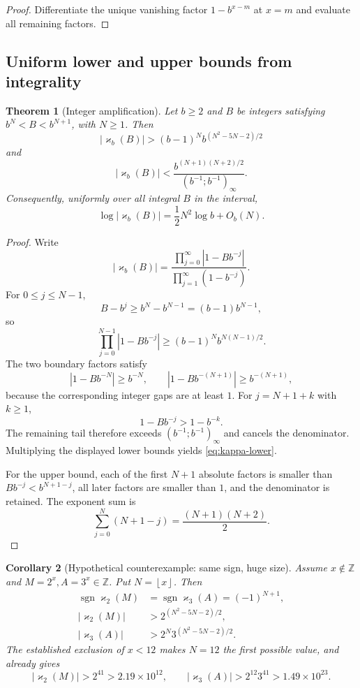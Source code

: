 \documentclass[11pt]{article}
\newtheorem{theorem}{Theorem}[section]
\newtheorem{corollary}[theorem]{Corollary}
\theoremstyle{definition}
\newcommand{\kk}{\varkappa}
\newcommand{\Z}{\mathbb{Z}}
\newcommand{\qpi}[2]{\left(#1;#2\right)_{\!\infty}}
\newcommand{\sgn}{\operatorname{sgn}}
\newcommand{\floor}[1]{\left\lfloor #1\right\rfloor}
\begin{document}
\begin{proof}
Differentiate the unique vanishing factor $1-b^{x-m}$ at $x=m$ and evaluate all remaining factors.
\end{proof}

\subsection{Uniform lower and upper bounds from integrality}

\begin{theorem}[Integer amplification]\label{thm:integer-amplification}
Let $b\ge2$ and $B$ be integers satisfying $b^N<B<b^{N+1}$, with $N\ge1$.  Then
\begin{equation}\label{eq:kappa-lower}
 \boxed{\displaystyle
 |\kk_b(B)|>(b-1)^N b^{(N^2-5N-2)/2}}
\end{equation}
and
\begin{equation}\label{eq:kappa-upper}
 |\kk_b(B)|<
 \frac{b^{(N+1)(N+2)/2}}{\qpi{b^{-1}}{b^{-1}}}.
\end{equation}
Consequently, uniformly over all integral $B$ in the interval,
\[
 \log|\kk_b(B)|=\frac12N^2\log b+O_b(N).
\]
\end{theorem}

\begin{proof}
Write
\[
 |\kk_b(B)|=
 \frac{\displaystyle\prod_{j=0}^{\infty}|1-Bb^{-j}|}
      {\displaystyle\prod_{j=1}^{\infty}(1-b^{-j})}.
\]
For $0\le j\le N-1$,
\[
 B-b^j\ge b^N-b^{N-1}=(b-1)b^{N-1},
\]
so
\[
 \prod_{j=0}^{N-1}|1-Bb^{-j}|
 \ge (b-1)^N b^{N(N-1)/2}.
\]
The two boundary factors satisfy
\[
 |1-Bb^{-N}|\ge b^{-N},\qquad
 |1-Bb^{-(N+1)}|\ge b^{-(N+1)},
\]
because the corresponding integer gaps are at least $1$.  For $j=N+1+k$ with $k\ge1$,
\[
 1-Bb^{-j}>1-b^{-k}.
\]
The remaining tail therefore exceeds $\qpi{b^{-1}}{b^{-1}}$ and cancels the denominator.  Multiplying the displayed lower bounds yields \eqref{eq:kappa-lower}.

For the upper bound, each of the first $N+1$ absolute factors is smaller than $Bb^{-j}<b^{N+1-j}$, all later factors are smaller than $1$, and the denominator is retained.  The exponent sum is
\[
 \sum_{j=0}^{N}(N+1-j)=\frac{(N+1)(N+2)}2.
\]
\end{proof}

\begin{corollary}[Hypothetical counterexample: same sign, huge size]\label{cor:AE-amplification}
Assume $x\notin\Z$ and $M=2^x,A=3^x\in\Z$.  Put $N=\floor{x}$.  Then
\begin{align}
 \sgn\kk_2(M)&=\sgn\kk_3(A)=(-1)^{N+1},\label{eq:same-sign}\\
 |\kk_2(M)|&>2^{(N^2-5N-2)/2},\label{eq:k2-lb}\\
 |\kk_3(A)|&>2^N3^{(N^2-5N-2)/2}.
 \label{eq:k3-lb}
\end{align}
The established exclusion of $x<12$ makes $N=12$ the first possible value, and already gives
\[
 |\kk_2(M)|>2^{41}>2.19\times10^{12},
 \qquad
 |\kk_3(A)|>2^{12}3^{41}>1.49\times10^{23}.
\]
\end{corollary}
\end{document}
